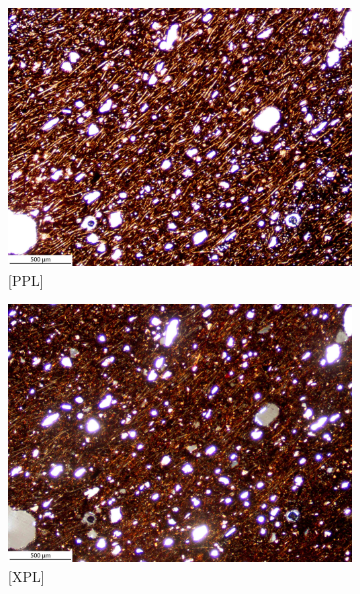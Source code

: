 \documentclass[a4paper]{article}
\begin{document}
\begin{figure}[H]
	\centering
	\begin{subfigure}[t]{.49\textwidth}
		\includegraphics[width=\textwidth]{ThinSections/105-1_4x_PPL.jpg}
		\caption{[PPL]}
	\end{subfigure}\hspace{.5em}\hfill
	\begin{subfigure}[t]{.49\textwidth}
		\includegraphics[width=\textwidth]{ThinSections/105-1_4x_XPL.jpg}
		\caption{[XPL]}
	\end{subfigure}
	\begin{subfigure}[t]{.49\textwidth}

\end{subfigure}
\end{figure}
\end{document}
